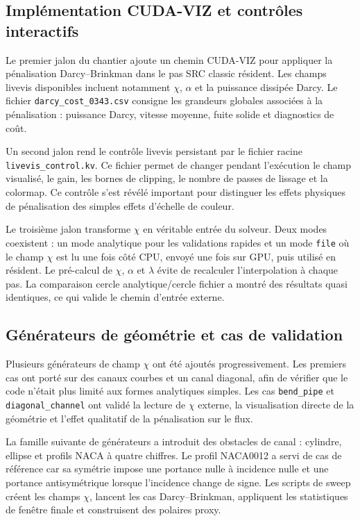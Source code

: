 \documentclass[11pt,a4paper]{article}
\begin{document}
\subsection{Implémentation CUDA-VIZ et contrôles interactifs}

Le premier jalon du chantier ajoute un chemin CUDA-VIZ pour appliquer la pénalisation Darcy--Brinkman dans le pas SRC classic résident. Les champs livevis disponibles incluent notamment $\chi$, $\alpha$ et la puissance dissipée Darcy. Le fichier \texttt{darcy\_cost\_0343.csv} consigne les grandeurs globales associées à la pénalisation : puissance Darcy, vitesse moyenne, fuite solide et diagnostics de coût.

Un second jalon rend le contrôle livevis persistant par le fichier racine \texttt{livevis\_control.kv}. Ce fichier permet de changer pendant l'exécution le champ visualisé, le gain, les bornes de clipping, le nombre de passes de lissage et la colormap. Ce contrôle s'est révélé important pour distinguer les effets physiques de pénalisation des simples effets d'échelle de couleur.

Le troisième jalon transforme $\chi$ en véritable entrée du solveur. Deux modes coexistent : un mode analytique pour les validations rapides et un mode \texttt{file} où le champ $\chi$ est lu une fois côté CPU, envoyé une fois sur GPU, puis utilisé en résident. Le pré-calcul de $\chi$, $\alpha$ et $\lambda$ évite de recalculer l'interpolation à chaque pas. La comparaison cercle analytique/cercle fichier a montré des résultats quasi identiques, ce qui valide le chemin d'entrée externe.

\subsection{Générateurs de géométrie et cas de validation}

Plusieurs générateurs de champ $\chi$ ont été ajoutés progressivement. Les premiers cas ont porté sur des canaux courbes et un canal diagonal, afin de vérifier que le code n'était plus limité aux formes analytiques simples. Les cas \texttt{bend\_pipe} et \texttt{diagonal\_channel} ont validé la lecture de $\chi$ externe, la visualisation directe de la géométrie et l'effet qualitatif de la pénalisation sur le flux.

La famille suivante de générateurs a introduit des obstacles de canal : cylindre, ellipse et profils NACA à quatre chiffres. Le profil NACA0012 a servi de cas de référence car sa symétrie impose une portance nulle à incidence nulle et une portance antisymétrique lorsque l'incidence change de signe. Les scripts de sweep créent les champs $\chi$, lancent les cas Darcy--Brinkman, appliquent les statistiques de fenêtre finale et construisent des polaires proxy.
\end{document}
